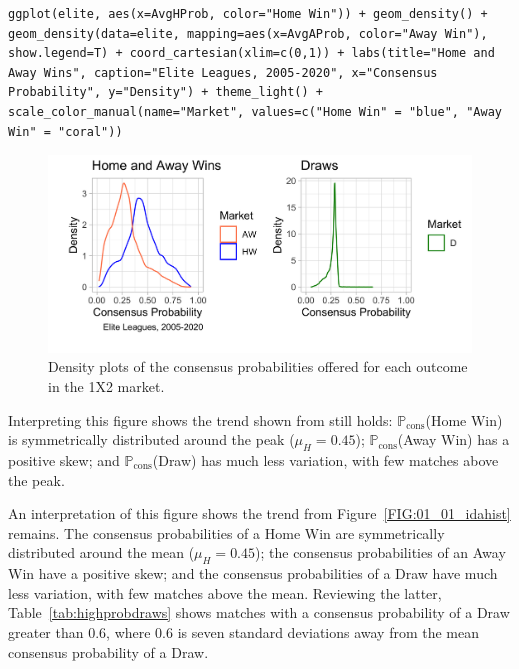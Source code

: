 \documentclass[a4paper,10pt]{report}
\begin{document}
\begin{lstlisting}
ggplot(elite, aes(x=AvgHProb, color="Home Win")) + geom_density() + geom_density(data=elite, mapping=aes(x=AvgAProb, color="Away Win"), show.legend=T) + coord_cartesian(xlim=c(0,1)) + labs(title="Home and Away Wins", caption="Elite Leagues, 2005-2020", x="Consensus Probability", y="Density") + theme_light() + scale_color_manual(name="Market", values=c("Home Win" = "blue", "Away Win" = "coral"))
\end{lstlisting}
\vspace{3mm}
\begin{figure}[h!]\begin{center}
	\includegraphics[width=\textwidth]{elite_02_edadensall.png}
	\caption{Density plots of the consensus probabilities offered for each outcome in the 1X2 market.}\label{FIG:01_02_edadensall} 	
\end{center}\end{figure}

Interpreting this figure shows the trend shown from still holds: $\mathbb{P}_{\textrm{cons}}$(Home Win) is symmetrically distributed around the peak ($\mu_{H}=0.45$); $\mathbb{P}_{\textrm{cons}}$(Away Win) has a positive skew; and $\mathbb{P}_{\textrm{cons}}$(Draw) has much less variation, with few matches above the peak. 

An interpretation of this figure shows the trend from Figure~\ref{FIG:01_01_idahist} remains. The consensus probabilities of a Home Win are symmetrically distributed around the mean ($\mu_{H}=0.45$); the consensus probabilities of an Away Win have a positive skew; and the consensus probabilities of a Draw have much less variation, with few matches above the mean. Reviewing the latter, Table~\ref{tab:highprobdraws} shows matches with a consensus probability of a Draw greater than 0.6, where 0.6 is seven standard deviations away from the mean consensus probability of a Draw. 
\end{document}
